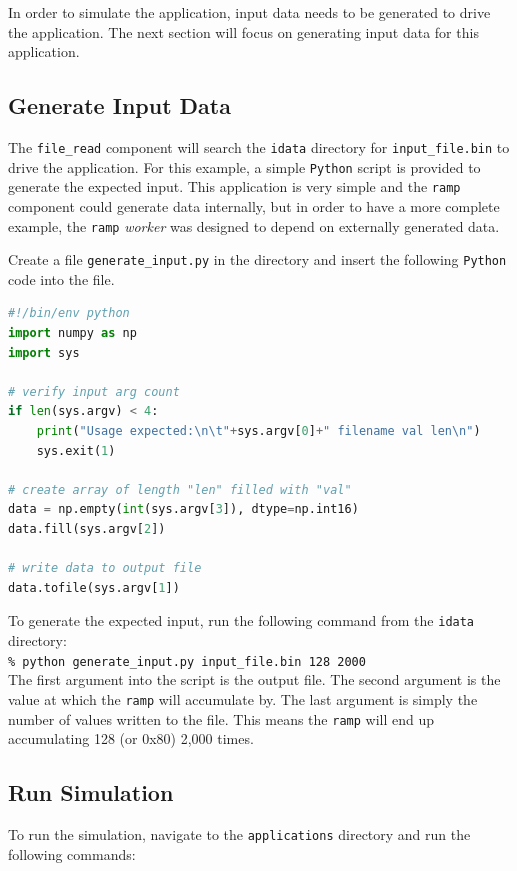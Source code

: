In order to simulate the application, input data needs to be generated to drive the application. The next section will focus on generating input data for this application.

\subsection{Generate Input Data}
The \verb+file_read+ component will search the \verb+idata+ directory for \verb+input_file.bin+ to drive the application. For this example, a simple \verb+Python+ script is provided to generate the expected input. This application is very simple and the \verb+ramp+ component could generate data internally, but in order to have a more complete example, the \verb+ramp+ \textit{worker} was designed to depend on externally generated data. \newline

Create a file \verb+generate_input.py+ in the  directory and insert the following \verb+Python+ code into the file.
\begin{lstlisting}[language=python]
#!/bin/env python
import numpy as np
import sys

# verify input arg count
if len(sys.argv) < 4:
    print("Usage expected:\n\t"+sys.argv[0]+" filename val len\n")
    sys.exit(1)

# create array of length "len" filled with "val"
data = np.empty(int(sys.argv[3]), dtype=np.int16)
data.fill(sys.argv[2])

# write data to output file
data.tofile(sys.argv[1])
\end{lstlisting}

To generate the expected input, run the following command from the \verb+idata+ directory:\\

\forceindent\verb+% python generate_input.py input_file.bin 128 2000+\\

The first argument into the script is the output file. The second argument is the value at which the \verb+ramp+ will accumulate by. The last argument is simply the number of values written to the file. This means the \verb+ramp+ will end up accumulating 128 (or 0x80) 2,000 times.

\subsection{Run Simulation}
\bstart
To run the simulation, navigate to the \verb+applications+ directory and run the following commands:\\

